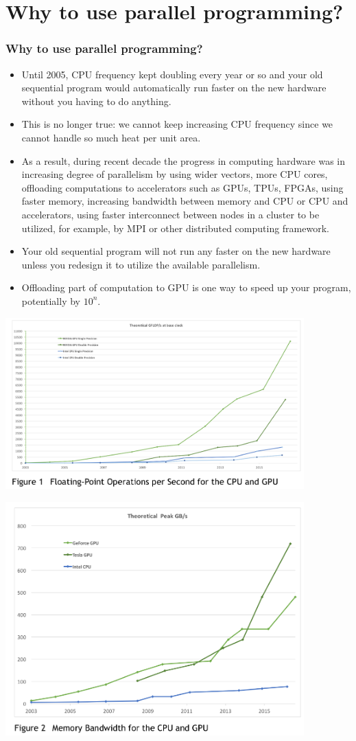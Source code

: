 \section{Why to use parallel programming?}
\begin{frame}[fragile]
  \frametitle{Why to use parallel programming?}
  \begin{itemize}
  \item Until 2005, CPU frequency kept doubling every year or so and your old sequential program would automatically run faster on the new hardware without you having to do anything.
  \item This is no longer true: we cannot keep increasing CPU frequency since we cannot handle so much heat per unit area.
  \item As a result, during recent decade the progress in computing hardware was in increasing degree of parallelism by using wider vectors, 
    more CPU cores, offloading computations to accelerators such as GPUs, TPUs, FPGAs, using faster memory, 
    increasing bandwidth between memory and CPU or CPU and accelerators, 
    using faster interconnect between nodes in a cluster to be utilized, for example, by MPI or other distributed computing framework.
  \item Your old sequential program will not run any faster on the new hardware unless 
    you redesign it to utilize the available parallelism.
  \item Offloading part of computation to GPU is one way to speed up your program, potentially by $10^n$.
  \end{itemize}
\end{frame}

\begin{frame}
\includegraphics[width=11.5cm]{graphs/fps.png}
\end{frame}


\begin{frame}
\includegraphics[width=11.5cm]{graphs/bps.png}
\end{frame}
